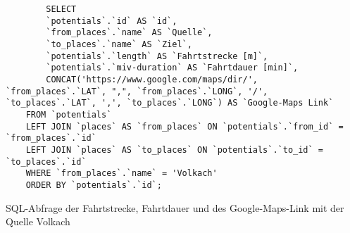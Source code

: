 \begin{listing}[htbp]
    \begin{verbatim}
        SELECT 
        `potentials`.`id` AS `id`, 
        `from_places`.`name` AS `Quelle`,
        `to_places`.`name` AS `Ziel`, 
        `potentials`.`length` AS `Fahrtstrecke [m]`, 
        `potentials`.`miv-duration` AS `Fahrtdauer [min]`,
        CONCAT('https://www.google.com/maps/dir/', `from_places`.`LAT`, ",", `from_places`.`LONG`, '/', `to_places`.`LAT`, ',', `to_places`.`LONG`) AS `Google-Maps Link`
    FROM `potentials`
    LEFT JOIN `places` AS `from_places` ON `potentials`.`from_id` = `from_places`.`id`
    LEFT JOIN `places` AS `to_places` ON `potentials`.`to_id` = `to_places`.`id`
    WHERE `from_places`.`name` = 'Volkach'
    ORDER BY `potentials`.`id`;
    \end{verbatim}
    \caption{SQL-Abfrage der Fahrtstrecke, Fahrtdauer und des Google-Maps-Link mit der Quelle Volkach}\label{lst-f-volkach}
\end{listing}